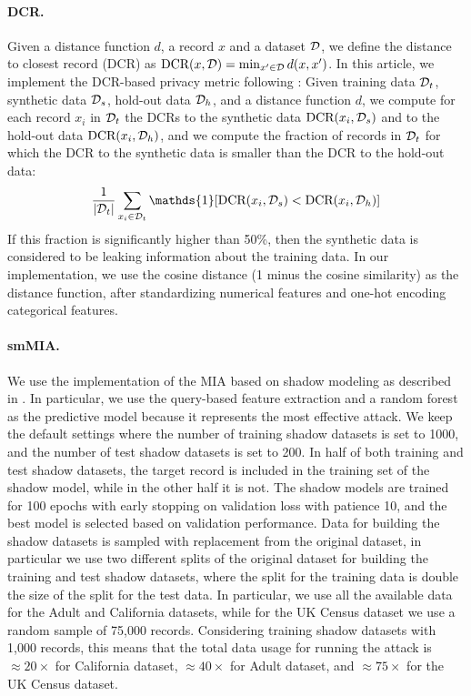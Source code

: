 \paragraph{DCR.}
Given a distance function $d$, a record $x$ and a dataset $\mathcal{D}$, we define the distance to closest record (DCR) as $\text{DCR}(x, \mathcal{D}) = \min_{x' \in \mathcal{D}} d(x, x')$.
In this article, we implement the DCR-based privacy metric following \citet{zhang2024mixed}:
Given training data $\mathcal{D}_t$, synthetic data $\mathcal{D}_s$, hold-out data $\mathcal{D}_h$, and a distance function $d$, we compute for each record $x_i$ in $\mathcal{D}_t$ the DCRs to the synthetic data $\text{DCR}(x_i, \mathcal{D}_s)$ and to the hold-out data $\text{DCR}(x_i, \mathcal{D}_h)$, and we compute the fraction of records in $\mathcal{D}_t$ for which the DCR to the synthetic data is smaller than the DCR to the hold-out data:
\begin{equation}
\frac{1}{|\data_t|} \sum_{x_i \in \data_t} \mathds{1}[\text{DCR}(x_i, \data_s) < \text{DCR}(x_i, \data_h)]
\end{equation}
If this fraction is significantly higher than 50\%, then the synthetic data is considered to be leaking information about the training data.
In our implementation, we use the cosine distance (1 minus the cosine similarity) as the distance function, after standardizing numerical features and one-hot encoding categorical features.


\paragraph{smMIA.}
We use the implementation of the MIA based on shadow modeling as described in \citet{meeus2023achilles}.
In particular, we use the query-based feature extraction \citep{houssiau2022tapas} and a random forest as the predictive model because it represents the most effective attack.
We keep the default settings where the number of training shadow datasets is set to 1000, and the number of test shadow datasets is set to 200. In half of both training and test shadow datasets, the target record is included in the training set of the shadow model, while in the other half it is not. The shadow models are trained for 100 epochs with early stopping on validation loss with patience 10, and the best model is selected based on validation performance.
Data for building the shadow datasets is sampled with replacement from the original dataset, in particular we use two different splits of the original dataset for building the training and test shadow datasets, where the split for the training data is double the size of the split for the test data. In particular, we use all the available data for the Adult and California datasets, while for the UK Census dataset we use a random sample of 75,000 records. Considering training shadow datasets with 1,000 records, this means that the total data usage for running the attack is $\approx20\times$ for California dataset, $\approx40\times$ for Adult dataset, and $\approx75\times$ for the UK Census dataset.

